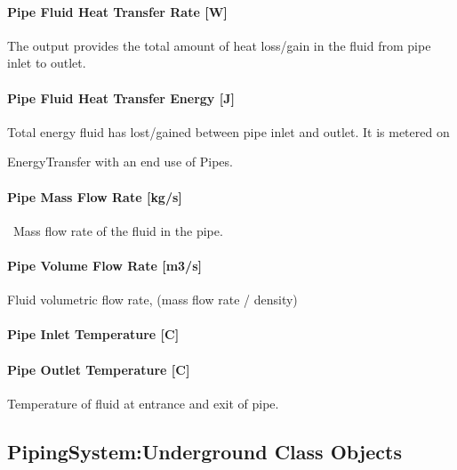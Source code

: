 \paragraph{Pipe Fluid Heat Transfer Rate {[}W{]}}\label{pipe-fluid-heat-transfer-rate-w-2}

The output provides the total amount of heat loss/gain in the fluid from pipe inlet to outlet.

\paragraph{Pipe Fluid Heat Transfer Energy {[}J{]}}\label{pipe-fluid-heat-transfer-energy-j-2}

Total energy fluid has lost/gained between pipe inlet and outlet. It is metered on

EnergyTransfer with an end use of Pipes.

\paragraph{Pipe Mass Flow Rate {[}kg/s{]}}\label{pipe-mass-flow-rate-kgs-2}

~Mass flow rate of the fluid in the pipe.

\paragraph{Pipe Volume Flow Rate {[}m3/s{]}}\label{pipe-volume-flow-rate-m3s-2}

Fluid volumetric flow rate, (mass flow rate / density)

\paragraph{Pipe Inlet Temperature {[}C{]}}\label{pipe-inlet-temperature-c-2}

\paragraph{Pipe Outlet Temperature {[}C{]}}\label{pipe-outlet-temperature-c-2}

Temperature of fluid at entrance and exit of pipe.

\subsection{PipingSystem:Underground Class Objects}\label{pipingsystemunderground-class-objects}

